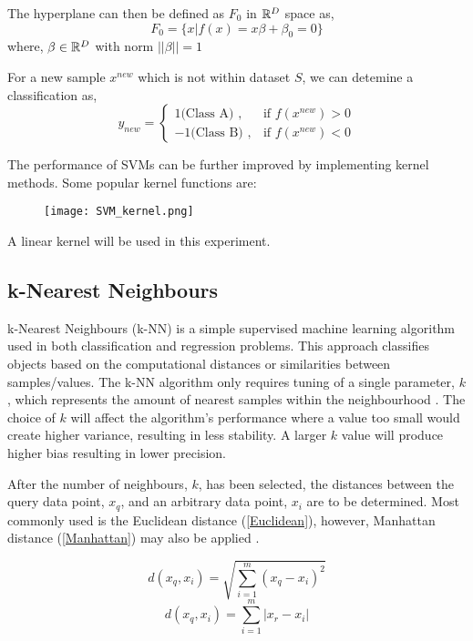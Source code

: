 The hyperplane can then be defined as $F_0$ in $\mathbb{R}^D$ space as,
\begin{equation}
    F_0 = \big \{x|f(x) = x \beta + \beta_0 = 0 \big \} 
\end{equation}  
where, 
$\beta \in \mathbb{R}^D$ with norm $||\beta|| = 1$

For a new sample $x^{new}$ which is not within dataset $S$, we can detemine a classification as,
\begin{equation}
    y_{new} = \begin{cases}
        1 \text{(Class A) }, & \text{if } f(x^{new}) > 0 \\
        -1 \text{(Class B) }, & \text{if } f(x^{new}) < 0
    \end{cases}
\end{equation}

The performance of SVMs can be further improved by implementing kernel methods. Some popular kernel functions are:
\begin{figure}[h]
    \texttt{[image: SVM\_kernel.png]}
    \centering
    \label{fig:kernel}
\end{figure}

A linear kernel will be used in this experiment.

\subsection{k-Nearest Neighbours}
k-Nearest Neighbours (k-NN) is a simple supervised machine learning algorithm used in both classification and regression problems. 
This approach classifies objects based on the computational distances or similarities between samples/values.
The k-NN algorithm only requires tuning of a single parameter, $k$, which represents the amount of nearest samples within the neighbourhood \cite{d163fd27cc414d1a806b3e2db0164bfc}.
The choice of $k$ will affect the algorithm's performance where a value too small would create higher variance, resulting in less stability.
A larger $k$ value will produce higher bias resulting in lower precision. 

After the number of neighbours, $k$, has been selected, the distances between the query data point, $x_q$, and an arbitrary data point, $x_i$ are to be determined.
Most commonly used is the Euclidean distance (\ref{Euclidean}), however, Manhattan distance (\ref{Manhattan}) may also be applied \cite{knn}.

\begin{equation} \label{Euclidean}
    d(x_q,x_i) = \sqrt{\sum_{i=1}^{m} (x_q - x_i)^2}
\end{equation}
\begin{equation} \label{Manhattan}
    d(x_q,x_i) = \sum_{i=1}^{m} \lvert x_r - x_i \rvert
\end{equation}

